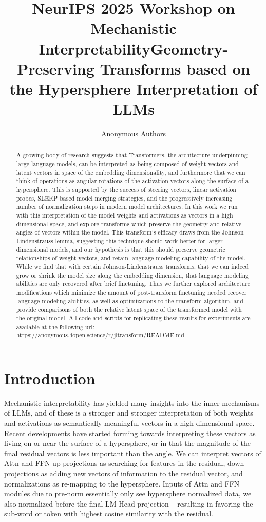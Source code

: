 \documentclass{article}
\title{NeurIPS 2025 Workshop on Mechanistic Interpretability}
\title{Geometry-Preserving Transforms based on the Hypersphere Interpretation of LLMs}
\author{Anonymous Authors}
\begin{document}
\maketitle

\begin{abstract}
A growing body of research suggests that Transformers, the architecture
underpinning large-language-models, can be interpreted as being composed of
weight vectors and latent vectors in space of the embedding dimensionality, and
furthermore that we can think of operations as angular rotations of the
activation vectors along the surface of a hypersphere. This is supported by the
success of steering vectors, linear activation probes, SLERP based model merging
strategies, and the progressively increasing number of normalization steps in
modern model architectures. In this work we run with this interpretation of the
model weights and activations as vectors in a high dimensional space, and
explore transforms which preserve the geometry and relative angles of vectors
within the model. This transform's efficacy draws from the Johnson-Lindenstrauss
lemma, suggesting this technique should work better for larger dimensional
models, and our hypothesis is that this should preserve geometric relationships
of weight vectors, and retain language modeling capability of the model. While
we find that with certain Johnson-Lindenstrauss transforms, that we can indeed
grow or shrink the model size along the embedding dimension, that language
modeling abilities are only recovered after brief finetuning. Thus we further
explored architecture modifications which minimize the amount of post-transform
finetuning needed recover language modeling abilities, as well as optimizations
to the transform algorithm, and provide comparisons of both the relative latent
space of the transformed model with the original model. All code and scripts for
replicating these results for experiments are available at the following url:
\url{https://anonymous.4open.science/r/jltransform/README.md}
\end{abstract}
 
\section{Introduction}
\label{sec:intro}
Mechanistic interpretability has yielded many insights into the inner mechanisms
of LLMs, and of these is a stronger and stronger interpretation of both weights
and activations as semantically meaningful vectors in a high dimensional space.
Recent developments have started forming towards interpreting these vectors as
living on or near the surface of a hypersphere, or in that the magnitude of the
final residual vectors is less important than the angle. We can interpret
vectors of Attn and FFN up-projections as searching for features in the
residual, down-projections as adding new vectors of information to the residual
vector, and normalizations as re-mapping to the hypersphere. Inputs of Attn and
FFN modules due to pre-norm essentially only see hypersphere normalized data, we
also normalized before the final LM Head projection -- resulting in favoring the
sub-word or token with highest cosine similarity with the residual.
\end{document}
